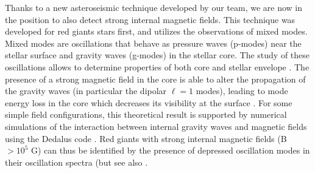 Thanks to a new asteroseismic technique developed by our team, we are now in the position to also detect strong internal magnetic fields.
This technique was developed for red giants stars first, and utilizes the observations of mixed modes. Mixed modes are
oscillations that behave as pressure waves (p-modes) near the stellar surface and gravity waves (g-modes) in the stellar core.
The study of these oscillations allows to determine properties of both core and stellar envelope \citep[e.g][]{Beck_2011}.
The presence of a strong magnetic field in the core is able to alter the propagation of the gravity waves (in particular the dipolar $\ell =1$ modes),
leading to mode energy loss in the core which decreases its visibility at the surface \citep{Fuller_2015}.
For some simple field configurations, this theoretical result is supported  by numerical simulations of the interaction between
internal gravity waves and magnetic fields using the Dedalus code \citep{Lecoanet_2016}.
Red giants with strong internal magnetic fields (B $> 10^5$ G) can thus be identified by the presence of depressed oscillation modes in their oscillation spectra \citep{Stello_2016} (but see also \citet{Mosser_2017}.

